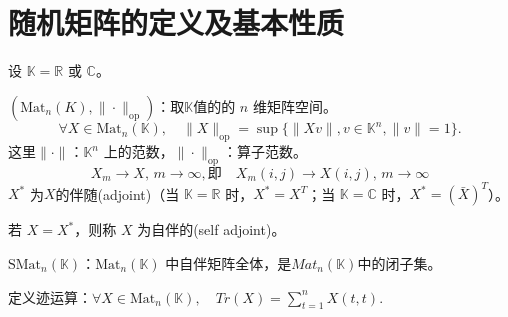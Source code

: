 \theoremstyle{plain}\newtheorem*{1}{习题1}
\theoremstyle{plain}\newtheorem*{2}{习题2}
\theoremstyle{plain}\newtheorem*{3}{习题3}
\theoremstyle{plain}\newtheorem*{4}{习题4}
\theoremstyle{plain}\newtheorem*{5}{习题5}
\theoremstyle{plain}\newtheorem*{6}{习题6}
\theoremstyle{plain}\newtheorem*{7}{习题7}
\theoremstyle{plain}\newtheorem*{8}{习题8}
\theoremstyle{plain}\newtheorem*{9}{习题9}
\theoremstyle{plain}\newtheorem*{10}{习题10}
\def\E{\mathbb{E}}
\def\R{\mathbb{R}}
\def\N{\mathbb{N}}
\def\B{\mathcal{B}}
\def\M{\mathcal{M}}
\def\prob{\mathbb{P}}
\def\t{\underline{t}}
\def\c{\underline{c}}
\newtheorem{prop}{性质}

\section{随机矩阵的定义及基本性质}

设 \(\mathbb{K} = \mathbb{R}\) 或 \(\mathbb{C}\)。

\( (\text{Mat}_n(K), \|\cdot\|_{\text{op}})\)：取$\mathbb{K}$值的的 \(n\) 维矩阵空间。
\begin{equation*}
\forall X \in \text{Mat}_n(\mathbb{K}), \quad \|X\|_{\text{op}} = \sup \{ \|Xv\|, v \in \mathbb{K}^n, \|v\|=1 \}.
\end{equation*}
这里\(\|\cdot\|\)：\(\mathbb{K}^n\) 上的范数，\(\|\cdot\|_{\text{op}}\)：算子范数。
\begin{equation*}
X_m \rightarrow X, \, m \rightarrow \infty,\text{即} \quad X_m(i,j) \rightarrow X(i,j), \, m \rightarrow \infty
\end{equation*}
\(X^*\) 为$X$的伴随(adjoint)（当 \(\mathbb{K} = \mathbb{R}\) 时，\(X^* = X^T\)；当 \(\mathbb{K} = \mathbb{C}\) 时，\(X^* = (\bar{X})^T\)）。

若 \(X = X^*\)，则称 \(X\) 为自伴的(self adjoint)。

\(\text{SMat}_n(\mathbb{K})\)：\(\text{Mat}_n(\mathbb{K})\) 中自伴矩阵全体，是$Mat_n(\mathbb{K})$中的闭子集。


定义迹运算：$\forall X \in \text{Mat}_n(\mathbb{K}), \quad Tr( X) = \sum\limits_{t=1}^n X(t,t)$.

